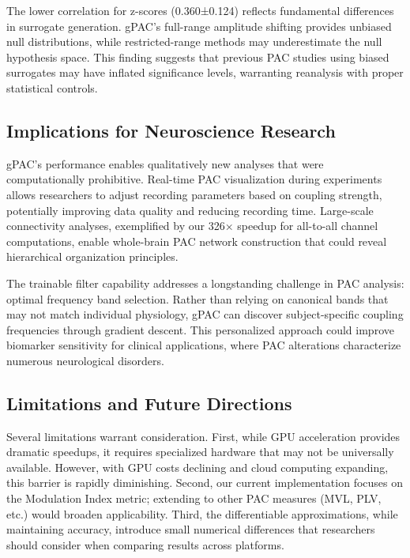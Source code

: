 The lower correlation for z-scores (0.360±0.124) reflects fundamental differences in surrogate generation. gPAC's full-range amplitude shifting provides unbiased null distributions, while restricted-range methods may underestimate the null hypothesis space. This finding suggests that previous PAC studies using biased surrogates may have inflated significance levels, warranting reanalysis with proper statistical controls.

\subsection{Implications for Neuroscience Research}

gPAC's performance enables qualitatively new analyses that were computationally prohibitive. Real-time PAC visualization during experiments allows researchers to adjust recording parameters based on coupling strength, potentially improving data quality and reducing recording time. Large-scale connectivity analyses, exemplified by our 326× speedup for all-to-all channel computations, enable whole-brain PAC network construction that could reveal hierarchical organization principles.

The trainable filter capability addresses a longstanding challenge in PAC analysis: optimal frequency band selection. Rather than relying on canonical bands that may not match individual physiology, gPAC can discover subject-specific coupling frequencies through gradient descent. This personalized approach could improve biomarker sensitivity for clinical applications, where PAC alterations characterize numerous neurological disorders.

\subsection{Limitations and Future Directions}

Several limitations warrant consideration. First, while GPU acceleration provides dramatic speedups, it requires specialized hardware that may not be universally available. However, with GPU costs declining and cloud computing expanding, this barrier is rapidly diminishing. Second, our current implementation focuses on the Modulation Index metric; extending to other PAC measures (MVL, PLV, etc.) would broaden applicability. Third, the differentiable approximations, while maintaining accuracy, introduce small numerical differences that researchers should consider when comparing results across platforms.

